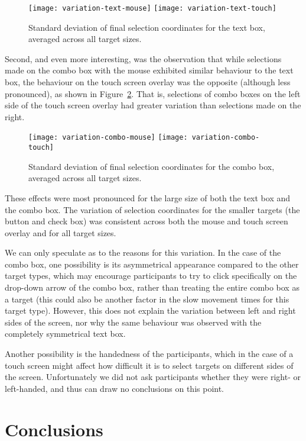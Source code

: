 \documentclass{elsart}
\begin{document}
\begin{figure}
	\centering
	\texttt{[image: variation-text-mouse]}
	\texttt{[image: variation-text-touch]}
	\caption{Standard deviation of final selection coordinates for the
	text box, averaged across all target sizes.}
	\label{fig-variation-textbox}
\end{figure}


Second, and even more interesting, was the observation that while
selections made on the combo box with the mouse exhibited similar
behaviour to the text box, the behaviour on the touch screen overlay was
the opposite (although less pronounced), as shown in
Figure~\ref{fig-variation-combobox}. That is, selections of combo boxes
on the left side of the touch screen overlay had greater variation than
selections made on the right.


\begin{figure}
	\centering
	\texttt{[image: variation-combo-mouse]}
	\texttt{[image: variation-combo-touch]}
	\caption{Standard deviation of final selection coordinates for the
	combo box, averaged across all target sizes.}
	\label{fig-variation-combobox}
\end{figure}


These effects were most pronounced for the large size of both the text
box and the combo box. The variation of selection coordinates for the
smaller targets (the button and check box) was consistent across both
the mouse and touch screen overlay and for all target sizes.

We can only speculate as to the reasons for this variation. In the case
of the combo box, one possibility is its asymmetrical appearance
compared to the other target types, which may encourage participants to
try to click specifically on the drop-down arrow of the combo box,
rather than treating the entire combo box as a target (this could also
be another factor in the slow movement times for this target type).
However, this does not explain the variation between left and right
sides of the screen, nor why the same behaviour was observed with the
completely symmetrical text box.

Another possibility is the handedness of the participants, which in the
case of a touch screen might affect how difficult it is to select
targets on different sides of the screen. Unfortunately we did not ask
participants whether they were right- or left-handed, and thus can draw
no conclusions on this point.


\section{Conclusions}
\label{sec-conclusions}
\end{document}
